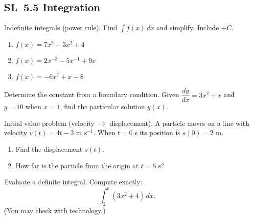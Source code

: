 \documentclass[11pt]{article}
\def\textbf#1{#1}%
\newcommand{\tocsubsection}[1]{\subsection{#1}}
\newcounter{question}
\begin{document}
\tocsubsection{SL 5.5 \; Integration}


\begin{question}
\textbf{Indefinite integrals (power rule).}
Find $\displaystyle\int f(x)\,dx$ and simplify. Include $+C$.
\begin{enumerate}
  \item $f(x)=7x^{5}-3x^{2}+4$
  \item $f(x)=2x^{-3}-5x^{-1}+9x$
  \item $f(x)=-6x^{7}+x-8$
\end{enumerate}
\end{question}

\begin{question}
\textbf{Determine the constant from a boundary condition.}
Given $\dfrac{dy}{dx}=3x^{2}+x$ and $y=10$ when $x=1$, find the particular solution $y(x)$.
\end{question}

\begin{question}
\textbf{Initial value problem (velocity $\to$ displacement).}
A particle moves on a line with velocity $v(t)=4t-3$ m s$^{-1}$. When $t=0$ s its position is $s(0)=2$ m.
\begin{enumerate}
  \item Find the displacement $s(t)$.
  \item How far is the particle from the origin at $t=5$ s?
\end{enumerate}
\end{question}

\begin{question}
\textbf{Evaluate a definite integral.}
Compute exactly:
\[
\int_{2}^{6} (3x^{2}+4)\,dx.
\]
(You may check with technology.)
\end{question}
\end{document}
